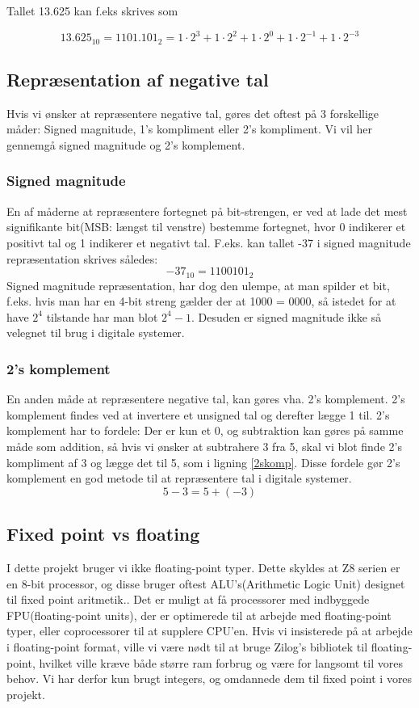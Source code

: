 Tallet 13.625 kan f.eks skrives som

\begin{equation}
13.625_{10} = 1101.101_2 = 1 \cdot 2^3+1 \cdot 2^2+1 \cdot 2^0+1 \cdot 2^{-1}+1 \cdot 2^{-3}
\end{equation}

\subsection{Repræsentation af negative tal}
Hvis vi ønsker at repræsentere negative tal, gøres det oftest på 3 forskellige måder: 
Signed magnitude, 1's kompliment eller 2's kompliment. Vi vil her gennemgå signed magnitude og 2's komplement.
\subsubsection{Signed magnitude}
En af måderne at repræsentere fortegnet på bit-strengen, er ved at lade det mest signifikante bit(MSB: længst til venstre) bestemme fortegnet, hvor 0 indikerer et positivt tal og 1 indikerer et negativt tal.  F.eks. kan tallet -37 i signed magnitude repræsentation skrives således:
\begin{equation}
-37_{10} = 1100101_2 
\end{equation}
Signed magnitude repræsentation, har dog den ulempe, at man spilder et bit, f.eks. hvis man har en 4-bit streng gælder der at 1000 =  0000, så istedet for at have $2^4$ tilstande har man blot $2^4-1$. Desuden er signed magnitude ikke så velegnet til brug i digitale systemer.\cite[s.~260]{Dlogic}
\subsubsection{2's komplement}
En anden måde at repræsentere negative tal, kan gøres vha. 2's komplement. 2's komplement findes ved at invertere et unsigned tal og derefter lægge 1 til. 2's komplement har to fordele: Der er kun et 0, og subtraktion kan gøres på samme måde som addition, så hvis vi ønsker at subtrahere 3 fra 5, skal vi blot finde 2's kompliment af 3 og lægge det til 5, som i ligning \ref{2skomp}. Disse fordele gør 2's komplement en god metode til at repræsentere tal i digitale systemer.
\begin{equation}
\label{2skomp}
 5-3 = 5+(-3)
\end{equation}


\subsection{Fixed point vs floating}
I dette projekt bruger vi ikke floating-point typer. Dette skyldes at Z8 serien er en 8-bit processor, og disse bruger oftest ALU's(Arithmetic Logic Unit) designet til fixed point aritmetik.\cite[s. ~5]{Zicomp}. Det er muligt at få processorer med indbyggede FPU(floating-point units), der er optimerede til at arbejde med floating-point typer, eller coprocessorer til at supplere CPU'en. Hvis vi insisterede på at arbejde i floating-point format, ville vi være nødt til at bruge Zilog's bibliotek til floating-point, hvilket ville kræve både større ram forbrug og være for langsomt til vores behov\cite{Zifloat}. Vi har derfor kun brugt integers, og omdannede dem til fixed point i vores projekt.
